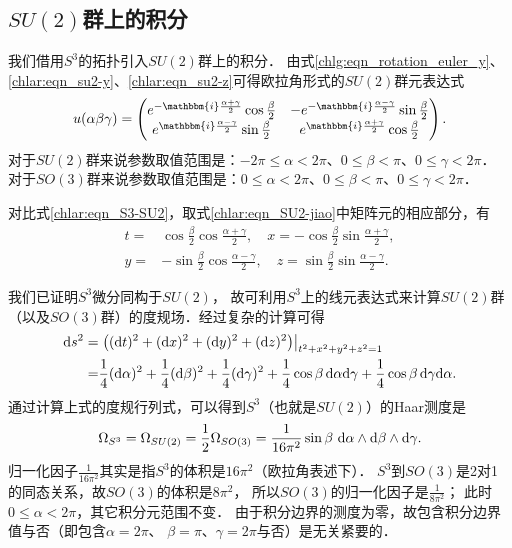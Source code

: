 \subsection{$SU(2)$群上的积分}

我们借用$S^3$的拓扑引入$SU(2)$群上的积分．
由式\eqref{chlg:eqn_rotation_euler_y}、\eqref{chlar:eqn_su2-y}、\eqref{chlar:eqn_su2-z}可得欧拉角形式的$SU(2)$群元表达式
\begin{equation}\label{chlar:eqn_SU2-jiao}
	u(\alpha\beta\gamma) = \begin{pmatrix}
		e^{-\mathbbm{i}\frac{\alpha+\gamma}{2} } \cos \frac{\beta}{2} & -e^{-\mathbbm{i} \frac{\alpha-\gamma}{2}}\sin\frac{\beta}{2} \\
		e^{\mathbbm{i} \frac{\alpha-\gamma}{2}}\sin\frac{\beta}{2} & e^{\mathbbm{i}\frac{\alpha+\gamma}{2} } \cos \frac{\beta}{2} 
	\end{pmatrix}.
\end{equation}
对于$SU(2)$群来说参数取值范围是：$-2\pi\leqslant \alpha < 2\pi$、$0\leqslant \beta < \pi$、$0\leqslant \gamma < 2\pi$．
对于$SO(3)$群来说参数取值范围是：$0 \leqslant \alpha < 2\pi$、$0\leqslant \beta < \pi$、$0\leqslant \gamma < 2\pi$．

对比式\eqref{chlar:eqn_S3-SU2}，取式\eqref{chlar:eqn_SU2-jiao}中矩阵元的相应部分，有
\begin{equation}
	\begin{aligned}
		t=&\cos \frac{\beta }{2} \cos \frac{\alpha +\gamma }{2}, \quad
		x=-\cos \frac{\beta }{2} \sin \frac{\alpha +\gamma }{2}, \\
		y=&-\sin \frac{\beta }{2} \cos \frac{\alpha -\gamma }{2}, \quad 
		z=\sin \frac{\beta }{2} \sin \frac{\alpha -\gamma }{2}.
	\end{aligned}
\end{equation}

我们已证明$S^3$微分同构于$SU(2)$，
故可利用$S^3$上的线元表达式来计算$SU(2)$群（以及$SO(3)$群）的度规场．经过复杂的计算可得
\begin{align}
	{\rm d} s^2 =& \left.\left(({\rm d} t)^2 + ({\rm d} x)^2 + ({\rm d} y)^2 + ({\rm d} z)^2
	\right)\right|_{t^2+x^2+y^2+z^2=1}  \notag \\
	=& \frac{1}{4} ({\rm d} \alpha)^2 + \frac{1}{4} ( {\rm d} \beta)^2 + \frac{1}{4} ( {\rm d} \gamma)^2 
	+ \frac{1}{4}\cos\beta \, {\rm d} \alpha {\rm d} \gamma + \frac{1}{4}\cos\beta \, 
	{\rm d} \gamma {\rm d} \alpha  .  \label{chlar:eqn_S3-metric}
\end{align}
通过计算上式的度规行列式，可以得到$S^3$（也就是$SU(2)$）的Haar测度是
\begin{equation}\label{chlar:eqn_Haar-S3-Euler}
	\Omega_{S^3} =\Omega_{SU(2)} = \frac{1}{2}\Omega_{SO(3)}
	= \frac{1}{16 \pi^2} \sin\beta \  {\rm d} \alpha \wedge {\rm d} \beta \wedge  {\rm d} \gamma .
\end{equation}%
归一化因子$\frac{1}{16 \pi^2}$其实是指$S^3$的体积是$16 \pi^2$（欧拉角表述下）．
$S^3$到$SO(3)$是2对1的同态关系，故$SO(3)$的体积是$8\pi^2$，
所以$SO(3)$的归一化因子是$\frac{1}{8 \pi^2}$；
此时$0 \leqslant \alpha < 2\pi$，其它积分元范围不变．
由于积分边界的测度为零，故包含积分边界值与否（即包含$\alpha=2\pi$、
$\beta=\pi$、$\gamma=2\pi$与否）是无关紧要的．


